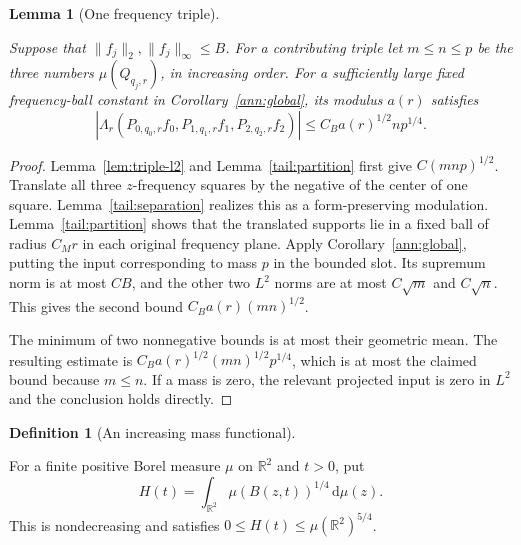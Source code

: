 \documentclass[11pt]{amsart}
\newcommand{\R}{\mathbb R}
\newcommand{\dd}{\,\mathrm d}
\newtheorem{lemma}[theorem]{Lemma}
\theoremstyle{definition}
\newtheorem{definition}[theorem]{Definition}
\theoremstyle{remark}
\numberwithin{equation}{section}
\providecommand{\lean}[1]{}
\providecommand{\leanok}{}
\begin{document}
\begin{lemma}[One frequency triple]\label{tail:one-triple}
\lean{Auto.tail_one_triple}
\leanok
Suppose that $\|f_j\|_2,\|f_j\|_\infty\le B$. For a contributing
triple let $m\le n\le p$ be the three numbers
$\mu(Q_{q_j,r})$, in increasing order. For a sufficiently large fixed
frequency-ball constant in Corollary~\ref{ann:global}, its modulus
$a(r)$ satisfies
\[
 |\Lambda_r(P_{0,q_0,r}f_0,P_{1,q_1,r}f_1,P_{2,q_2,r}f_2)|
       \le C_B a(r)^{1/2}n p^{1/4}.
\]
\end{lemma}
\begin{proof}
Lemma~\ref{lem:triple-l2} and Lemma~\ref{tail:partition} first give
$C(mnp)^{1/2}$. Translate all three $z$-frequency squares by the negative
of the center of one square. Lemma~\ref{tail:separation} realizes this
as a form-preserving modulation. Lemma~\ref{tail:partition} shows that
the translated supports lie in a fixed ball of radius $C_Mr$ in each
original frequency plane. Apply Corollary~\ref{ann:global}, putting
the input corresponding to mass $p$ in the bounded slot. Its supremum
norm is at most $CB$, and the other two $L^2$ norms are at most
$C\sqrt m$ and $C\sqrt n$. This gives the second bound
$C_Ba(r)(mn)^{1/2}$.

The minimum of two nonnegative bounds is at most their geometric mean.
The resulting estimate is
$C_Ba(r)^{1/2}(mn)^{1/2}p^{1/4}$, which is at most the claimed bound
because $m\le n$. If a mass is zero, the relevant projected input is
zero in $L^2$ and the conclusion holds directly.
\end{proof}

\begin{definition}[An increasing mass functional]\label{tail:mass-definition}
\lean{Auto.tailH}
For a finite positive Borel measure $\mu$ on $\R^2$ and $t>0$, put
\[
 H(t)=\int_{\R^2}\mu(B(z,t))^{1/4}\dd\mu(z).
\]
This is nondecreasing and satisfies
$0\le H(t)\le\mu(\R^2)^{5/4}$.
\end{definition}
\end{document}
